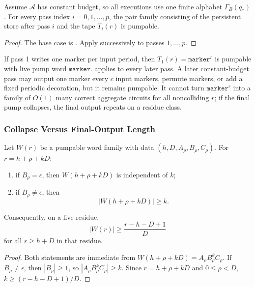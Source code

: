 \begin{corollary}
\label{app:cor:per-tape}
Assume $\mathcal{A}$ has constant budget, so all executions use one finite
alphabet $\Gamma_B(q_*)$. For every pass index $i=0,1,\ldots,p$, the pair
family consisting of the persistent store after pass $i$ and the tape $T_i(r)$
is pumpable.
\end{corollary}

\begin{proof}
The base case is . Apply
 successively to passes $1,\ldots,p$.
\end{proof}

\begin{remark}
\label{app:rem:unary}
If pass 1 writes one marker per input period, then
$T_1(r)=\mathtt{marker}^r$ is pumpable with live pump word
$\mathtt{marker}$.  applies to every later
pass. A later constant-budget pass may output one marker every $c$ input
markers, permute markers, or add a fixed periodic decoration, but it remains
pumpable. It cannot turn $\mathtt{marker}^r$ into a family of $O(1)$ many
correct aggregate circuits for all noncolliding $r$; if the final pump
collapses, the final output repeats on a residue class.
\end{remark}

\subsubsection{Collapse Versus Final-Output Length}

\begin{lemma}
\label{app:lem:bounded-or-linear}
Let $W(r)$ be a pumpable word family with data
$(h,D,A_\rho,B_\rho,C_\rho)$. For $r=h+\rho+kD$:
\begin{enumerate}[label=(\alph*)]
\item if $B_\rho=\epsilon$, then $W(h+\rho+kD)$ is independent of $k$;
\item if $B_\rho\ne\epsilon$, then
\[
  |W(h+\rho+kD)|\ge k.
\]
\end{enumerate}
Consequently, on a live residue,
\[
  |W(r)|\ge \frac{r-h-D+1}{D}
\]
for all $r\ge h+D$ in that residue.
\end{lemma}

\begin{proof}
Both statements are immediate from
$W(h+\rho+kD)=A_\rho B_\rho^k C_\rho$. If $B_\rho\ne\epsilon$, then
$|B_\rho|\ge1$, so $|A_\rho B_\rho^k C_\rho|\ge k$. Since
$r=h+\rho+kD$ and $0\le\rho<D$, $k\ge(r-h-D+1)/D$.
\end{proof}

